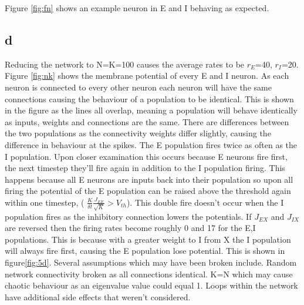 \documentclass[twoside,twocolumn]{article}
\begin{document}
Figure \ref{fig:fn} shows an example neuron in E and I behaving as expected.



\subsection{d}
Reducing the network to N=K=100 causes the average rates to be $r_E$=40, $r_I$=20. Figure \ref{fig:nk} shows the membrane potential of every E and I neuron. As each neuron is connected to every other neuron each neuron will have the same connections causing the behaviour of a population to be identical.  This is shown in the figure as the lines all overlap, meaning a population will behave identically as inputs, weights and connections are the same. There are differences between the two populations as the connectivity weights differ slightly, causing the difference in behaviour at the spikes. The E population fires twice as often as the I population. Upon closer examination this occurs because E neurons fire first, the next timestep they'll fire again in addition to the I population firing. This happens because all E neurons are inputs back into their population so upon all firing the potential of the E population can be raised above the threshold again within one timestep, ( $\frac{K}{\delta t}\frac{J_{EE}}{\sqrt{K}} >V_{th}$). This double fire doesn't occur when the I population fires as the inhibitory connection lowers the potentials. If $J_{EX}$ and $J_{IX}$ are reversed then the firing rates become roughly 0 and 17 for the E,I populations. This is because with a greater weight to I from X the I population will always fire first, causing the E population lose potential. This is shown in figure\ref{fig:5d}.
\newline
Several assumptions which may have been broken include. Random network connectivity broken as all connections identical. K=N which may cause chaotic behaviour as an eigenvalue value could equal 1. Loops within the network have additional side effects that weren't considered.
\end{document}

